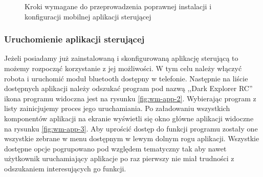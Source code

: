 \begin{figure}[h!]
 \caption{Kroki wymagane do przeprowadzenia poprawnej instalacji i konfiguracji mobilnej aplikacji sterującej}
 \label{fig:wm-install&conf}
\end{figure}

\subsubsection{Uruchomienie aplikacji sterującej}
Jeżeli posiadamy już zainstalowaną i skonfigurowaną aplikację sterującą to
możemy rozpocząć korzystanie z jej możliwości. W tym celu należy włączyć robota
i uruchomić moduł bluetooth dostępny w telefonie. Następnie na liście dostępnych
aplikacji należy odszukać program pod nazwą ,,Dark Explorer RC'' ikona programu
widoczna jest na rysunku \ref{fig:wm-app-2}. Wybierając program z listy
zainicjujemy proces jego uruchamiania. Po załadowaniu wszystkich komponentów
aplikacji na ekranie wyświetli się okno główne aplikacji widoczne na rysunku
\ref{fig:wm-app-3}. Aby uprościć dostęp do funkcji programu zostały one
wszystkie zebrane w menu dostępnym w lewym dolnym rogu aplikacji. Wszystkie
dostępne opcje pogrupowano pod względem tematyczny tak aby nawet użytkownik
uruchamiający aplikacje po raz pierwszy nie miał trudności z odszukaniem
interesujących go funkcji. 

